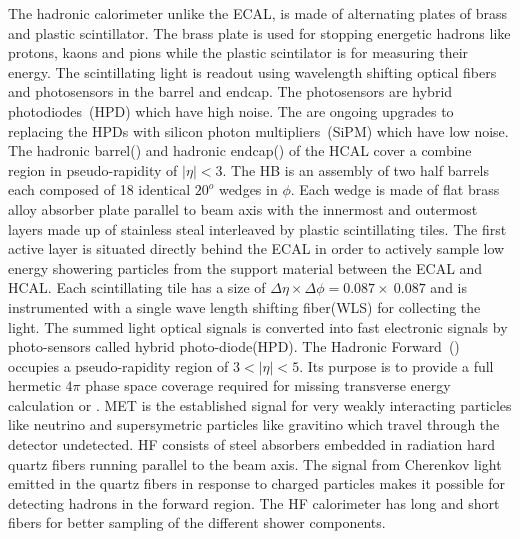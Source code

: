 The hadronic calorimeter unlike the ECAL, is made of alternating plates of brass and plastic scintillator. The brass plate is used for stopping energetic hadrons like protons, kaons and pions while the plastic scintilator is for measuring their
energy. The scintillating light is readout using wavelength shifting optical fibers and photosensors in the barrel and endcap. The photosensors are hybrid photodiodes~(HPD) which have high noise. The are ongoing upgrades to replacing the HPDs with silicon photon multipliers~(SiPM) which have low noise. 
The  hadronic barrel() and hadronic endcap() of the HCAL cover a combine region in pseudo-rapidity of $\vert \eta \vert < 3$. 
The HB is an assembly of two half barrels each composed of 18 identical $20^{o}$ wedges in $\phi$. Each wedge is made of flat brass alloy absorber plate parallel to beam axis with the innermost and outermost layers made up of stainless steal interleaved by plastic scintillating tiles.
The first active layer is situated directly behind the ECAL in order to actively sample low energy showering particles from the support material between the ECAL and HCAL. Each scintillating tile has a size of $\Delta\eta\times\Delta\phi=0.087 \times\ 0.087$ and is instrumented with a single wave length shifting fiber(WLS) for collecting the light. The summed light optical signals is converted into fast electronic signals by photo-sensors called  hybrid photo-diode(HPD).
\newline
The Hadronic Forward~() occupies a pseudo-rapidity region of $3 < \vert \eta \vert < 5$.
Its purpose is to provide a full hermetic $4\pi$  phase space coverage required for missing transverse energy calculation or . MET is the established signal for very weakly interacting particles like neutrino and supersymetric particles like gravitino which travel through the detector undetected. %
HF consists of steel absorbers embedded in radiation hard quartz fibers running parallel to the beam axis. The signal from Cherenkov light emitted in the quartz fibers in response to charged particles makes it possible for detecting hadrons in the forward region. The HF calorimeter has long and short fibers for better sampling of the different shower components.
